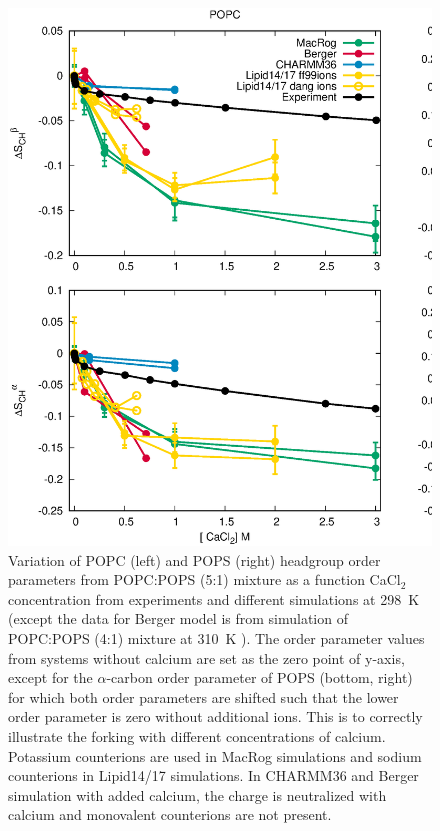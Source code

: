 \documentclass[aps,prl,superscriptaddress,twocolumn]{revtex4}
\begin{document}
\begin{figure}[ht]
  \centering
  \includegraphics[width=18cm]{../Figs/CHANGESwithCaClPS.eps}
  \caption{\label{changesWITHCaClPS}
   Variation of POPC (left) and POPS (right) headgroup order parameters from POPC:POPS (5:1) mixture
    as a function CaCl$_2$ concentration from experiments \cite{roux90} and different simulations
    at 298~K (except the data for Berger model is from simulation of POPC:POPS (4:1) mixture at 310~K \cite{ollila07a,melcrova16}). 
    The order parameter values from systems without calcium are set as the zero point of y-axis,
    except for the $\alpha$-carbon order parameter of POPS (bottom, right) for which both order parameters are shifted
    such that the lower order parameter is zero without additional ions. This is to correctly illustrate
    the forking with different concentrations of calcium.
    Potassium counterions are used in MacRog simulations and sodium counterions in Lipid14/17 simulations.
    In CHARMM36 and Berger simulation with added calcium, the charge is neutralized with calcium and monovalent counterions are not present.
  }
\end{figure}
\end{document}
